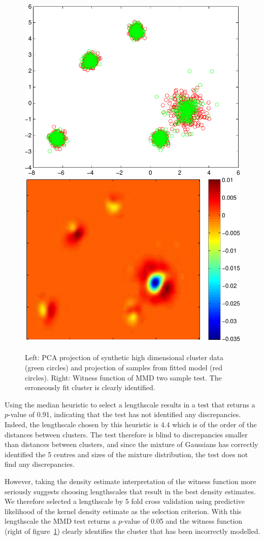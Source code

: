 \documentclass{article} %
\begin{document}
\begin{figure}[ht]
\centering
\includegraphics[width=0.4\columnwidth]{figures/high_mog_pca}
\hspace{0.1\columnwidth}
\includegraphics[width=0.4\columnwidth]{figures/high_mog_witness}
\caption{
Left: PCA projection of synthetic high dimensional cluster data (green circles) and projection of samples from fitted model (red circles).
Right: Witness function of MMD two sample test. The erroneously fit cluster is clearly identified.
}
\label{fig:high_mog}
\end{figure}

Using the median heuristic to select a lengthscale results in a test that returns a $p$-value of 0.91, indicating that the test has not identified any discrepancies.
Indeed, the lengthscale chosen by this heuristic is $4.4$ which is of the order of the distances between clusters.
The test therefore is blind to discrepancies smaller than distances between clusters, and since the mixture of Gaussians has correctly identified the 5 centres and sizes of the mixture distribution, the test does not find any discrepancies.

However, taking the density estimate interpretation of the witness function more seriously suggests choosing lengthscales that result in the best density estimates.
We therefore selected a lengthscale by 5 fold cross validation using predictive likelihood of the kernel density estimate as the selection criterion.
With this lengthscale the MMD test returns a $p$-value of 0.05 and the witness function (right of figure~\ref{fig:high_mog}) clearly identifies the cluster that has been incorrectly modelled.
\end{document}
